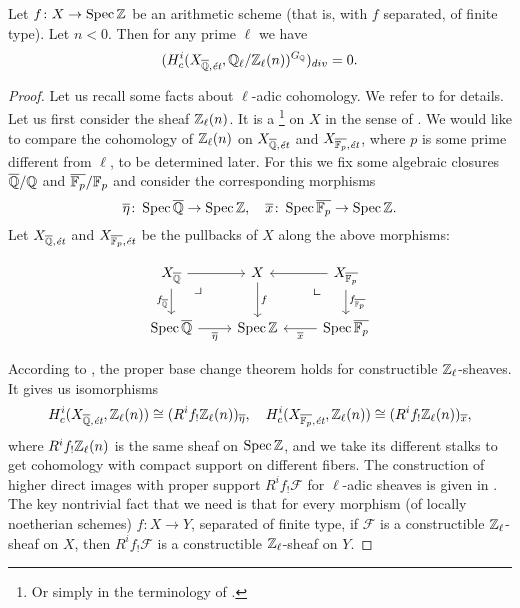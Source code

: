 \begin{proposition}
  \label{prop:l-adic-cohomology-key-lemma}
  Let $f\colon X\to \operatorname{Spec} \mathbb{Z}$ be an arithmetic scheme (that is, with $f$
  separated, of finite type). Let $n < 0$. Then for any prime $\ell$ we have
  $$(H^i_c (X_{\overline{\mathbb{Q}},\text{\it ét}}, \mathbb{Q}_\ell/\mathbb{Z}_\ell (n))^{G_{\mathbb{Q}}})_{div} = 0.$$

  \begin{proof}
    Let us recall some facts about $\ell$-adic cohomology. We refer to
    \cite[Exposé VI]{SGA5} for details. Let us first consider the sheaf
    $\mathbb{Z}_\ell (n)$. It is a \footnote{Or
      simply  in the terminology of
      \cite[Rapport]{SGA4-1-2}.} on $X$ in the sense of
    \cite[Exposé VI, 1.1.1]{SGA5}. We would like to compare the cohomology of
    $\mathbb{Z}_\ell (n)$ on $X_{\overline{\mathbb{Q}},\text{\it ét}}$ and
    $X_{\overline{\mathbb{F}_p},\text{\it ét}}$, where $p$ is some prime different from
    $\ell$, to be determined later.  For this we fix some algebraic closures
    $\overline{\mathbb{Q}}/\mathbb{Q}$ and $\overline{\mathbb{F}_p}/\mathbb{F}_p$ and consider the
    corresponding morphisms
    \[ \overline{\eta}\colon \operatorname{Spec} \overline{\mathbb{Q}} \to \operatorname{Spec} \mathbb{Z}, \quad
      \overline{x}\colon \operatorname{Spec} \overline{\mathbb{F}_p} \to \operatorname{Spec} \mathbb{Z}. \]
    Let $X_{\overline{\mathbb{Q}},\text{\it ét}}$ and
    $X_{\overline{\mathbb{F}_p},\text{\it ét}}$ be the pullbacks of $X$ along the above
    morphisms:

    \[ \begin{tikzcd}
        X_{\overline{\QQ}} \ar{r}\tikzpb\ar{d}[swap]{f_{\overline{\QQ}}} & X \ar{d}{f} & X_{\overline{\FF_p}} \ar{l}\ar{d}{f_{\overline{\FF_p}}}\tikzpbur \\
        \Spec \overline{\QQ} \ar{r}[swap]{\overline{\eta}} & \Spec \ZZ & \Spec \overline{\FF_p} \ar{l}{\overline{x}}
      \end{tikzcd} \]

    According to \cite[Exposé VI, 2.2.3]{SGA5}, the proper base change theorem
    holds for constructible $\mathbb{Z}_\ell$-sheaves. It gives us isomorphisms
    \[ H^i_c (X_{\overline{\mathbb{Q}}, \text{\it ét}}, \mathbb{Z}_\ell (n)) \cong
      (R^i f_! \mathbb{Z}_\ell (n))_{\overline{\eta}},
      \quad
      H^i_c (X_{\overline{\mathbb{F}_p}, \text{\it ét}}, \mathbb{Z}_\ell (n)) \cong
      (R^i f_! \mathbb{Z}_\ell (n))_{\overline{x}}, \]
    where $R^i f_! \mathbb{Z}_\ell (n)$ is the same sheaf on $\operatorname{Spec} \mathbb{Z}$, and we take
    its different stalks to get cohomology with compact support on different
    fibers. The construction of higher direct images with proper support
    $R^i f_! \mathcal{F}$ for $\ell$-adic sheaves is given in
    \cite[Exposé VI, \S 2.2]{SGA5}. The key nontrivial fact that we need is that
    for every morphism (of locally noetherian schemes) $f\colon X\to Y$,
    separated of finite type, if $\mathcal{F}$ is a constructible
    $\mathbb{Z}_\ell$-sheaf on $X$, then $R^i f_! \mathcal{F}$ is a constructible
    $\mathbb{Z}_\ell$-sheaf on $Y$.


\end{proof}
\end{proposition}
